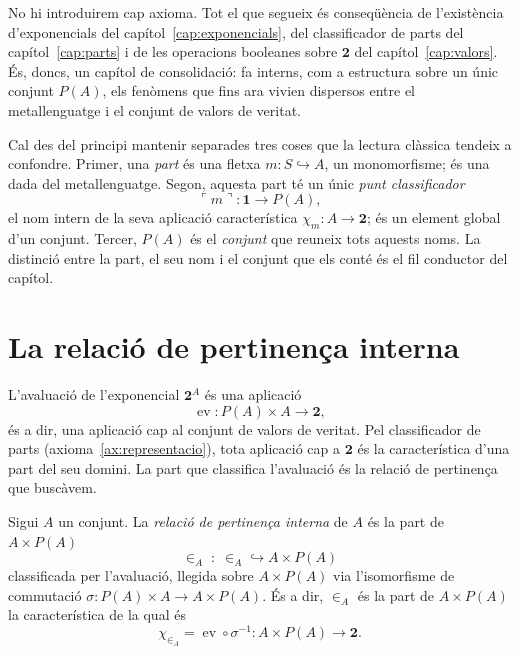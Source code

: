 No hi introduirem cap axioma. Tot el que segueix és conseqüència de
l'existència d'exponencials del capítol~\ref{cap:exponencials}, del
classificador de parts del capítol~\ref{cap:parts} i de les operacions
booleanes sobre \(\mathbf2\) del capítol~\ref{cap:valors}. És, doncs, un
capítol de consolidació: fa interns, com a estructura sobre un únic
conjunt \(P(A)\), els fenòmens que fins ara vivien dispersos entre el
metallenguatge i el conjunt de valors de veritat.

Cal des del principi mantenir separades tres coses que la lectura clàssica
tendeix a confondre. Primer, una \emph{part} és una fletxa
\(m\colon S\hookrightarrow A\), un monomorfisme; és una dada del
metallenguatge. Segon, aquesta part té un únic \emph{punt classificador}
\[
\ulcorner m\urcorner\colon\mathbf1\to P(A),
\]
el nom intern de la seva aplicació característica \(\chi_m\colon A\to\mathbf2\);
és un element global d'un conjunt. Tercer, \(P(A)\) és el \emph{conjunt}
que reuneix tots aquests noms. La distinció entre la part, el seu nom i el
conjunt que els conté és el fil conductor del capítol.

\section{La relació de pertinença interna}\label{sec:pertinenca-interna}

L'avaluació de l'exponencial \(\mathbf2^{A}\) és una aplicació
\[
\operatorname{ev}\colon P(A)\times A\to\mathbf2,
\]
és a dir, una aplicació cap al conjunt de valors de veritat. Pel
classificador de parts (axioma~\ref{ax:representacio}), tota aplicació cap
a \(\mathbf2\) és la característica d'una part del seu domini. La part que
classifica l'avaluació és la relació de pertinença que buscàvem.

\begin{definicio}\label{def:pertinenca-interna}
Sigui \(A\) un conjunt. La \emph{relació de pertinença interna} de \(A\)
és la part de \(A\times P(A)\)
\[
{\in_A}\;\colon\;{\in_A}\hookrightarrow A\times P(A)
\]
classificada per l'avaluació, llegida sobre \(A\times P(A)\) via
l'isomorfisme de commutació \(\sigma\colon P(A)\times A\to A\times P(A)\).
És a dir, \(\in_A\) és la part de \(A\times P(A)\) la característica de la
qual és
\[
\chi_{\in_A}=\operatorname{ev}\circ\sigma^{-1}\colon A\times P(A)\to\mathbf2 .
\]
\end{definicio}

